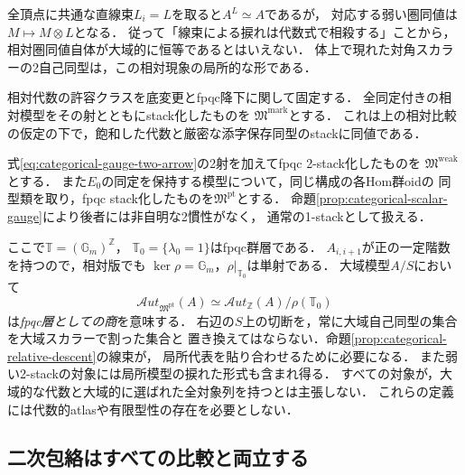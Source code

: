 全頂点に共通な直線束$L_i=L$を取ると$A^L\simeq A$であるが，
対応する弱い圏同値は$M\mapsto M\otimes L$となる．
従って「線束による捩れは代数式で相殺する」ことから，
相対圏同値自体が大域的に恒等であるとはいえない．
体上で現れた対角スカラーの2自己同型は，この相対現象の局所的な形である．

\begin{definition}[比較する三種類のモジュライ]
\label{def:categorical-three-moduli}
相対代数の許容クラスを底変更とfpqc降下に関して固定する．
全同定付きの相対模型をその射とともにstack化したものを
$\mathfrak M^{\mathrm{mark}}$とする．
これは上の相対比較の仮定の下で，飽和した代数と厳密な添字保存同型のstackに同値である．

式\eqref{eq:categorical-gauge-two-arrow}の2射を加えてfpqc 2-stack化したものを
$\mathfrak M^{\mathrm{weak}}$とする．
また$E_0$の同定を保持する模型について，同じ構成の各Hom群oidの
同型類を取り，fpqc stack化したものを$\mathfrak M^{\mathrm{pt}}$とする．
命題\ref{prop:categorical-scalar-gauge}により後者には非自明な2慣性がなく，
通常の1-stackとして扱える．
\end{definition}

ここで$\mathbb T=(\mathbb G_m)^{\mathbb Z}$，
$\mathbb T_0=\{\lambda_0=1\}$はfpqc群層である．
$A_{i,i+1}$が正の一定階数を持つので，相対版でも
$\ker\rho=\mathbb G_m$，$\rho|_{\mathbb T_0}$は単射である．
大域模型$A/S$において
\begin{equation}\label{eq:categorical-pointed-aut-sheaf}
 \mathcal Aut_{\mathfrak M^{\mathrm{pt}}}(A)
   \simeq \mathcal Aut_{\mathbb Z}(A)/\rho(\mathbb T_0)
\end{equation}
は\emph{fpqc層としての商}を意味する．
右辺の$S$上の切断を，常に大域自己同型の集合を大域スカラーで割った集合と
置き換えてはならない．命題\ref{prop:categorical-relative-descent}の線束が，
局所代表を貼り合わせるために必要になる．
また弱い2-stackの対象には局所模型の捩れた形式も含まれ得る．
すべての対象が，大域的な代数と大域的に選ばれた全対象列を持つとは主張しない．
これらの定義には代数的atlasや有限型性の存在を必要としない．

\subsection{二次包絡はすべての比較と両立する}

